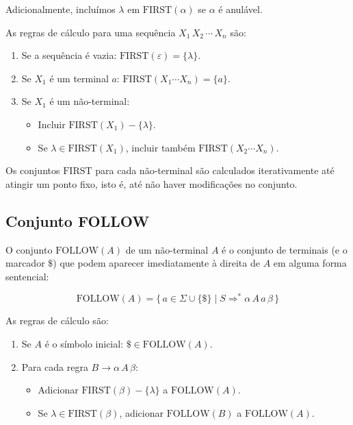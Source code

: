 Adicionalmente, incluímos \(\lambda\) em \(\mathrm{FIRST}(\alpha)\)
se \(\alpha\) é anulável.

As regras de cálculo para uma sequência \(X_1\, X_2\, \cdots\, X_n\) são:

\begin{enumerate}
  \item
    Se a sequência é vazia: \(\mathrm{FIRST}(\varepsilon) = \{\lambda\}\).
  \item
    Se \(X_1\) é um terminal \(a\): \(\mathrm{FIRST}(X_1 \cdots X_n) = \{a\}\).
  \item
    Se \(X_1\) é um não-terminal:

    \begin{itemize}
      \item
        Incluir \(\mathrm{FIRST}(X_1) - \{\lambda\}\).
      \item
        Se \(\lambda \in \mathrm{FIRST}(X_1)\), incluir também
        \(\mathrm{FIRST}(X_2 \cdots X_n)\).
    \end{itemize}
\end{enumerate}

Os conjuntos \(\mathrm{FIRST}\) para cada não-terminal são calculados
iterativamente até atingir um ponto fixo, isto é, até não haver
modificações no conjunto.

\subsection{Conjunto FOLLOW}

O conjunto \(\mathrm{FOLLOW}(A)\) de um não-terminal \(A\) é o
conjunto de terminais (e o marcador \(\$\)) que podem aparecer
imediatamente à direita de \(A\) em alguma forma sentencial:

\[
  \mathrm{FOLLOW}(A) = \{\, a \in \Sigma \cup \{\$\} \mid S
  \Rightarrow^* \alpha\, A\, a\, \beta \,\}
\]

As regras de cálculo são:

\begin{enumerate}
  \item
    Se \(A\) é o símbolo inicial: \(\$ \in \mathrm{FOLLOW}(A)\).
  \item
    Para cada regra \(B \to \alpha\, A\, \beta\):
    \begin{itemize}
      \item
        Adicionar \(\mathrm{FIRST}(\beta) - \{\lambda\}\) a
        \(\mathrm{FOLLOW}(A)\).
      \item
        Se \(\lambda \in \mathrm{FIRST}(\beta)\), adicionar
        \(\mathrm{FOLLOW}(B)\) a \(\mathrm{FOLLOW}(A)\).
    \end{itemize}
\end{enumerate}

